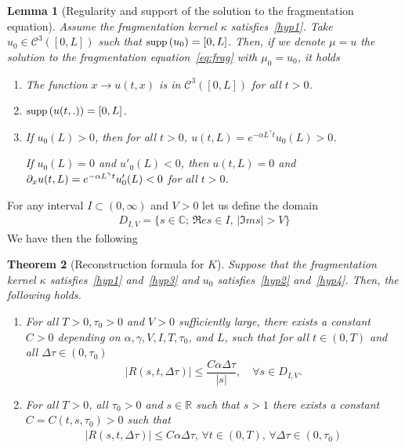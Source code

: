 \documentclass[10pt]{amsart}
\newtheorem{theo}{Theorem}[section]
\newtheorem{lemm}[theo]{Lemma}\newtheorem{prop}[theo]{Proposition}\newtheorem{coro}[theo]{Corollary}\newtheorem{conj}[theo]{Conjecture}
\theoremstyle{definition}\newtheorem{defi}[theo]{Definition}\newtheorem{rema}[theo]{Remark}\newtheorem{exam}[theo]{Example}\newtheorem{exem}[theo]{Example}\newtheorem{nota}[theo]{Notation}
\newcommand*\p{\partial}
\renewcommand*\a{\alpha}
\newcommand*\R{\mathbb{R}}
\newcommand*\C{\mathbb{C}}
\newcommand{\clC}{\mathcal{C}}
\newcommand*\supp{{\mbox{\small\rm supp}}\,}
\newcommand*{\relabel}{\renewcommand{\labelenumi}{(\theenumi)}}
\newcommand*{\romanenumi}{\renewcommand*{\theenumi}{\roman{enumi}}\relabel}
\let\oldforall\forall
\renewcommand*{\forall}{\mathrel{\oldforall}}
\begin{document}
\begin{lemm}[Regularity and support of the solution to the fragmentation equation]\label{lemma:prop}
Assume the fragmentation kernel $\kappa$ satisfies~\eqref{hyp1}. Take $u_0 \in \clC^3([0,L])$ such that $\supp(u_0)=[0,L]$. Then, if we denote $\mu = u$ the solution to the fragmentation equation~\eqref{eq:frag} with $\mu _0=u_0$, it holds
\begin{enumerate}
\item\label{1} The function $x \to u(t,x)$ is in $\clC^3([0,L])$ for all $t>0$.
\item $\supp(u(t,.)) = [0,L]$.
\item If $u_0(L)>0$, then for all $t>0$, $u(t,L)= e^{-\a L^{\gamma}t}u_0(L)>0$.

If $u_0(L)=0$ and $u'_0(L)<0$, then $u(t,L)=0$ and $\p_x u(t,L)= e^{-\a L^{\gamma}t}u'_0(L)\linebreak<0$ for all $t>0$.
\end{enumerate}
\end{lemm}


For any interval $I\subset (0, \infty)$ and $V>0$ let us define the domain
\begin{align*}
D_{I, V}=\{s\in \C;\,\Re e s\in I,\,|\Im m s|>V \}
\end{align*}
We have then the following



\begin{theo}[Reconstruction formula for $K$]\label{thm:reco}
Suppose that the fragmentation kernel $\kappa $ satisfies~\eqref{hyp1} and~\eqref{hyp3} and $u_0$ satisfies~\eqref{hyp2} and~\eqref{hyp4}. Then, the following holds.
\begin{enumerate}\romanenumi
\item\label{theo4.4.1} For all $T>0, \tau _0>0$ and $V>0$ sufficiently large, there exists a constant $C>0$ depending on $\alpha, \gamma, V, I, T, \tau _0$, and $L$, such that for all $t\in (0, T)$ and all $\Delta \tau \in (0, \tau _0)$
\begin{equation}\label{thm:recoE1}
|R(s,t,\Delta \tau)|
\leq
\dfrac{C\a \Delta \tau }{|s|},
\quad \forall s\in D _{I, V}.
\end{equation}
\item\label{theo4.4.2} For all $T>0$, all $\tau _0>0$ and $s\in \R$ such that $s>1$ there exists a constant $C=C(t, s, \tau _0)>0$ such that
\begin{align}\label{thm:recoE15}
|R(s, t, \Delta \tau)|\le C\alpha \Delta \tau,\,\forall t\in (0, T),\,\forall \Delta \tau\in (0, \tau _0)
\end{align}
\end{enumerate}
\end{theo}
\end{document}
